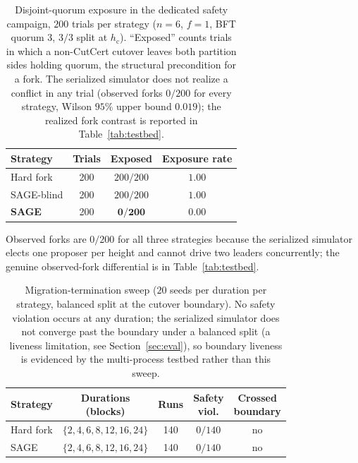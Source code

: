 \documentclass[journal]{IEEEtran}
\theoremstyle{definition}
\theoremstyle{remark}
\begin{document}
\begin{table}[t]
\centering
\begin{threeparttable}
\caption{Disjoint-quorum exposure in the dedicated safety campaign,
$200$ trials per strategy ($n{=}6$, $f{=}1$, BFT quorum $3$, $3/3$ split at $h_{\mathrm{c}}$).
``Exposed'' counts trials in which a non-CutCert cutover leaves both partition sides holding
quorum, the structural precondition for a fork. The serialized simulator does not realize a
conflict in any trial (observed forks $0/200$ for every strategy, Wilson $95\%$ upper bound
$0.019$); the realized fork contrast is reported in Table~\ref{tab:testbed}.}
\label{tab:appsafety}
\setlength{\tabcolsep}{6pt}\renewcommand{\arraystretch}{1.15}\footnotesize
\begin{tabular}{lccc}
\toprule
Strategy & Trials & Exposed & Exposure rate \\
\midrule
Hard fork     & 200 & $200/200$         & $1.00$ \\
SAGE-blind    & 200 & $200/200$         & $1.00$ \\
\textbf{SAGE} & 200 & $\mathbf{0/200}$  & $\mathbf{0.00}$ \\
\bottomrule
\end{tabular}
\begin{tablenotes}\footnotesize
\item Observed forks are $0/200$ for all three strategies because the serialized simulator
elects one proposer per height and cannot drive two leaders concurrently; the genuine
observed-fork differential is in Table~\ref{tab:testbed}.
\end{tablenotes}
\end{threeparttable}
\end{table}

\begin{table}[t]
\centering
\caption{Migration-termination sweep
($20$ seeds per duration per strategy, balanced split at the cutover boundary). No safety violation
occurs at any duration; the serialized simulator does not converge past the boundary under a
balanced split (a liveness limitation, see Section~\ref{sec:eval}), so boundary liveness is
evidenced by the multi-process testbed rather than this sweep.}
\label{tab:apptermination}
\setlength{\tabcolsep}{4pt}\renewcommand{\arraystretch}{1.15}\footnotesize
\begin{tabular}{lcccc}
\toprule
Strategy & \makecell{Durations\\(blocks)} & Runs & \makecell{Safety\\viol.} & \makecell{Crossed\\boundary} \\
\midrule
Hard fork & $\{2,4,6,8,12,16,24\}$ & 140 & $0/140$ & no \\
SAGE      & $\{2,4,6,8,12,16,24\}$ & 140 & $0/140$ & no \\
\bottomrule
\end{tabular}
\end{table}
\end{document}
